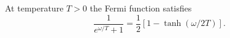 \documentclass{article}
\begin{document}
At temperature $T>0$ the Fermi function satisfies
\begin{equation}
\frac{1}{e^{\omega/T}+1} = \frac{1}{2}\left[1-\tanh(\omega/2T)\right] .
\label{eq:tanh}
\end{equation}
\end{document}
